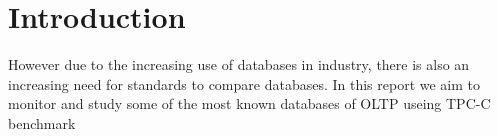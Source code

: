 \documentclass[main.tex]{subfiles}
\begin{document}
    \section{Introduction}
    However due to the increasing use of databases in industry, there is also an increasing need for standards to compare databases. In this report we aim to monitor and study some of the most known databases of OLTP useing TPC-C benchmark
\end{document}
